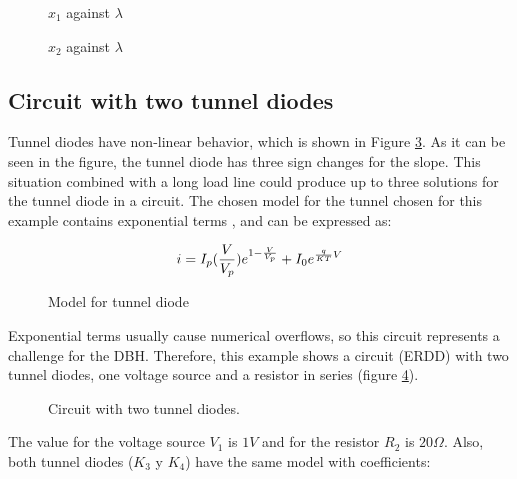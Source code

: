 \documentclass[conference,letterpaper,onecolumn]{IEEEtran}
\begin{document}
\begin{figure}[hbtp]
\centerline{
}
\caption{$x_1$ against $\lambda$}
\label{homote1}
\end{figure}

\begin{figure}[hbtp]
\centerline{
}
\caption{$x_2$ against $\lambda$}
\label{homote2}
\end{figure}

\subsection{Circuit with two tunnel diodes}

Tunnel diodes have non-linear behavior, which is shown in Figure \ref{tunelmod}. As it can be seen in the figure, the tunnel diode has three sign changes for the slope. This situation combined with a long load line could produce up to three solutions for the tunnel diode in a circuit. The chosen model for the tunnel chosen for this example contains exponential terms \cite{homo_sze},\cite{homo_shur} and can be expressed as:

\begin{displaymath}
i=I_p({V \over V_p})e^{1-{V \over V_p}}+I_0e^{{q \over {KT}} V}
\end{displaymath}

\begin{figure}[hbtp]
\centerline{
\epsfxsize=65mm
}
\caption{Model for tunnel diode}
\label{tunelmod}
\end{figure}

Exponential terms usually cause numerical overflows, so this circuit represents a challenge for the DBH. Therefore, this example shows a circuit (ERDD) with two tunnel diodes, one voltage source and a resistor in series (figure \ref{2tunel}).

\begin{figure}[hbtp]
\centerline{
\epsfxsize=80mm 
}
\caption{Circuit with two tunnel diodes.}
\label{2tunel}  
\end{figure}

The value for the voltage source $V_1$ is $1V$ and for the resistor $R_2$ is $20\Omega$. Also, both tunnel diodes ($K_3$ y $K_4$) have the same model with coefficients:
\end{document}
